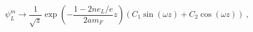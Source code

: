 \begin{equation}
\psi_L ^{m} \to \frac{1}{\sqrt{z}} \exp
\left(-\frac{1-2ne_L/e}{2am_F}z\right)  \left(C_1 \sin(\omega z) +
C_2 \cos(\omega z)\right)~,
\end{equation}

